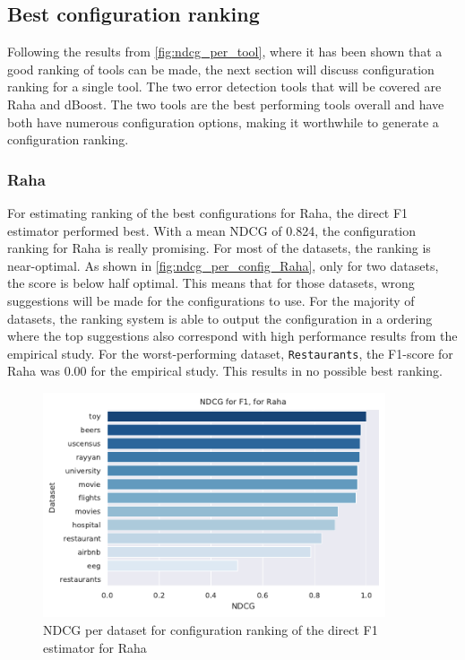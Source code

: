 \subsection{Best configuration ranking}
Following the results from \autoref{fig:ndcg_per_tool}, where it has been shown that a good ranking of tools can be made, the next section will discuss configuration ranking for a single tool. The two error detection tools that will be covered are Raha and dBoost. The two tools are the best performing tools overall and have both have numerous configuration options, making it worthwhile to generate a configuration ranking.

\subsubsection{Raha} 
For estimating ranking of the best configurations for Raha, the direct F1 estimator performed best.
With a mean NDCG of 0.824, the configuration ranking for Raha is really promising. For most of the datasets, the ranking is near-optimal. As shown in \autoref{fig:ndcg_per_config_Raha}, only for two datasets, the score is below half optimal. This means that for those datasets, wrong suggestions will be made for the configurations to use. For the majority of datasets, the ranking system is able to output the configuration in a ordering where the top suggestions also correspond with high performance results from the empirical study. For the worst-performing dataset, \verb|Restaurants|, the F1-score for Raha was 0.00 for the empirical study. This results in no possible best ranking.

\begin{figure}[H]
    \centering
    \includegraphics[width=0.9\textwidth]{thesis/Figures/RQ3/15_f1_profiler_NDCG_Raha.pdf}
    \caption{NDCG per dataset for configuration ranking of the direct F1 estimator for Raha}
    \label{fig:ndcg_per_config_Raha}
\end{figure}

